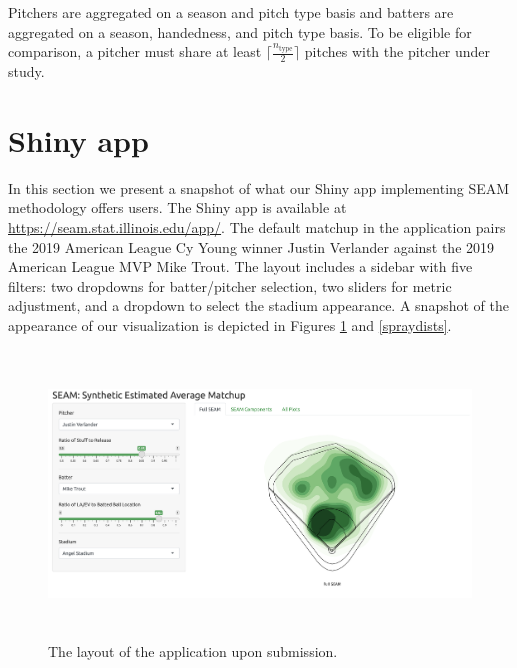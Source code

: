 \documentclass[12pt]{article}
\begin{document}
Pitchers are aggregated on a season and pitch type basis and batters are aggregated on a season, handedness, and pitch type basis. To be eligible for comparison, a pitcher must share at least  $\lceil \frac{n_{\text{type}}}{2} \rceil$ pitches with the pitcher under study.




\section{Shiny app}

In this section we present a snapshot of what our Shiny app implementing SEAM methodology offers users. The Shiny app is available at \url{https://seam.stat.illinois.edu/app/}. The default matchup in the application pairs the 2019 American League Cy Young winner Justin Verlander against the 2019 American League MVP Mike Trout. The layout includes a sidebar with five filters: two dropdowns for batter/pitcher selection, two sliders for metric adjustment, and a dropdown to select the stadium appearance. A snapshot of the appearance of our visualization is depicted in Figures \ref{layout} and \ref{spraydists}.


\begin{figure}
\centering
    \includegraphics[width=5.5in, height=3in]{nFig1_layout.png}
    \caption{The layout of the application upon submission.}
    \label{layout}
\end{figure}
\end{document}
